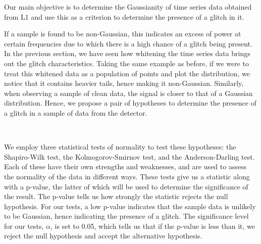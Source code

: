 \documentclass[12pt]{article}
\begin{document}
Our main objective is to determine the Gaussianity of time series data obtained from L1 and use this as a criterion to determine the presence of a glitch in it. 

\medskip
\noindent If a sample is found to be non-Gaussian, this indicates an excess of power at certain frequencies due to which there is a high chance of a glitch being present. In the previous section, we have seen how whitening the time series data brings out the glitch characteristics. Taking the same example as before, if we were to treat this whitened data as a population of points and plot the distribution, we notice that it contains heavier tails, hence making it non-Gaussian. Similarly, when observing a sample of clean data, the signal is closer to that of a Gaussian distribution. Hence, we propose a pair of hypotheses to determine the presence of a glitch in a sample of data from the detector.


\medskip
\noindent{}
\\
\noindent{}

\medskip
\noindent We employ three statistical tests of normality to test these hypotheses: the Shapiro-Wilk test, the Kolmogorov-Smirnov test, and the Anderson-Darling test. Each of these have their own strengths and weaknesses, and are used to assess the normality of the data in different ways. These tests give us a statistic along with a p-value, the latter of which will be used to determine the significance of the result. The p-value tells us how strongly the statistic rejects the null hypothesis. For our tests, a low p-value indicates that the sample data is unlikely to be Gaussian, hence indicating the presence of a glitch. The significance level for our tests, $\alpha$, is set to 0.05, which tells us that if the p-value is less than it, we reject the null hypothesis and accept the alternative hypothesis.
\end{document}
